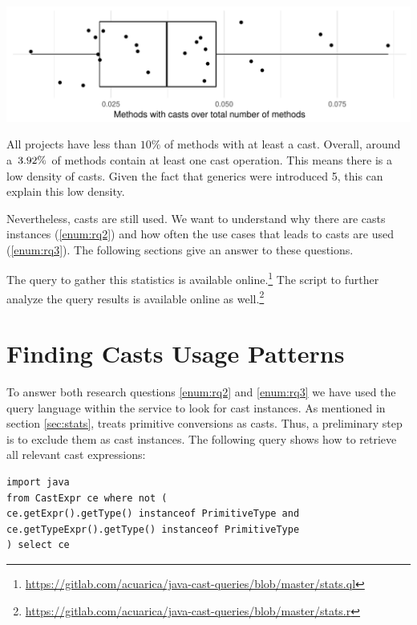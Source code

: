 \includegraphics[width=\columnwidth]{stats-methodwcast.pdf}

All projects have less than $10\%$ of methods with at least a cast.
Overall, around a~$3.92\%{}$ of methods contain at least one cast operation. 
This means there is a low density of casts.
Given the fact that generics were introduced \java{} 5, this can explain this low density.

Nevertheless, casts are still used.
We want to understand why there are casts instances (\ref{enum:rq2}) and how often the use cases that leads to casts are used (\ref{enum:rq3}).
The following sections give an answer to these questions.

The query to gather this statistics is available online.\footnote{\url{https://gitlab.com/acuarica/java-cast-queries/blob/master/stats.ql}}
The  script to further analyze the query results is available online as well.\footnote{\url{https://gitlab.com/acuarica/java-cast-queries/blob/master/stats.r}}





\section{Finding Casts Usage Patterns}

\label{sec:methodology}

To answer both research questions \ref{enum:rq2} and \ref{enum:rq3} we have used the \ql{} query language within the \lgtm{} service to look for cast instances.
As mentioned in section \ref{sec:stats}, \ql{} treats primitive conversions as casts.
Thus, a preliminary step is to exclude them as cast instances.
The following \ql{} query shows how to retrieve all relevant cast expressions:

\begin{lstlisting}[style=ql,caption=\ql{} query to retrieve all relevant cast expressions.]
import java
from CastExpr ce where not (
ce.getExpr().getType() instanceof PrimitiveType and
ce.getTypeExpr().getType() instanceof PrimitiveType
) select ce
\end{lstlisting}

